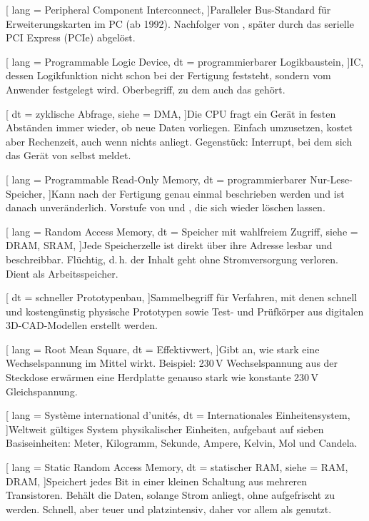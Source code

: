 [
  lang  = Peripheral Component Interconnect,
]{Paralleler Bus-Standard für Erweiterungskarten im PC (ab 1992). Nachfolger von , später durch das serielle PCI Express (PCIe) abgelöst.}

[
  lang  = Programmable Logic Device,
  dt    = programmierbarer Logikbaustein,
]{IC, dessen Logikfunktion nicht schon bei der Fertigung feststeht, sondern vom Anwender festgelegt wird. Oberbegriff, zu dem auch das  gehört.}

[
  dt    = zyklische Abfrage,
  siehe = DMA,
]{Die CPU fragt ein Gerät in festen Abständen immer wieder, ob neue Daten vorliegen. Einfach umzusetzen, kostet aber Rechenzeit, auch wenn nichts anliegt. Gegenstück: Interrupt, bei dem sich das Gerät von selbst meldet.}

[
  lang  = Programmable Read-Only Memory,
  dt    = programmierbarer Nur-Lese-Speicher,
]{Kann nach der Fertigung genau einmal beschrieben werden und ist danach unveränderlich. Vorstufe von  und , die sich wieder löschen lassen.}

[
  lang  = Random Access Memory,
  dt    = Speicher mit wahlfreiem Zugriff,
  siehe = {DRAM, SRAM},
]{Jede Speicherzelle ist direkt über ihre Adresse lesbar und beschreibbar. Flüchtig, d.\,h. der Inhalt geht ohne Stromversorgung verloren. Dient als Arbeitsspeicher.}

[
  dt    = schneller Prototypenbau,
]{Sammelbegriff für Verfahren, mit denen schnell und kostengünstig physische Prototypen sowie Test- und Prüfkörper aus digitalen 3D-CAD-Modellen erstellt werden.}

[
  lang  = Root Mean Square,
  dt    = Effektivwert,
]{Gibt an, wie stark eine Wechselspannung im Mittel wirkt. Beispiel: 230\,V Wechselspannung aus der Steckdose erwärmen eine Herdplatte genauso stark wie konstante 230\,V Gleichspannung.}

[
  lang  = Système international d’unités,
  dt    = Internationales Einheitensystem,
]{Weltweit gültiges System physikalischer Einheiten, aufgebaut auf sieben Basiseinheiten: Meter, Kilogramm, Sekunde, Ampere, Kelvin, Mol und Candela.}

[
  lang  = Static Random Access Memory,
  dt    = statischer RAM,
  siehe = {RAM, DRAM},
]{Speichert jedes Bit in einer kleinen Schaltung aus mehreren Transistoren. Behält die Daten, solange Strom anliegt, ohne aufgefrischt zu werden. Schnell, aber teuer und platzintensiv, daher vor allem als  genutzt.}

